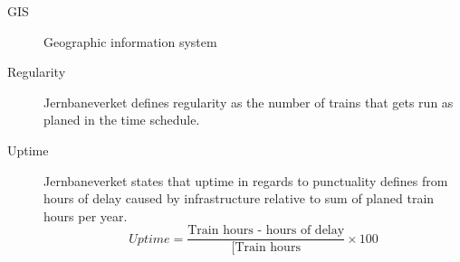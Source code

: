 \label{sec:abbriv}
\vspace{5mm}

\begin{description}
\item [GIS] Geographic information system
\item [Regularity]	Jernbaneverket defines regularity as the number of trains that gets run as planed in the time schedule. 
\item [Uptime]	Jernbaneverket states that uptime in regards to punctuality defines from hours of delay caused by infrastructure relative to sum of planed train hours per year. \begin{equation} Uptime =
\frac{\text{Train hours - hours of delay}}{[\text{Train hours}}\times 100 \end{equation}
\end{description}


